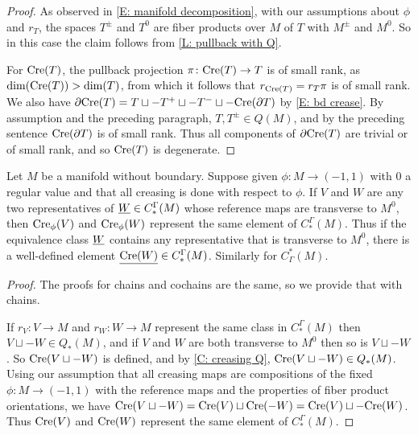\begin{proof}
	As observed in \cref{E: manifold decomposition}, with our assumptions about $\phi$ and $r_T$, the spaces $T^\pm$ and $T^0$ are fiber products over $M$ of $T$ with $M^\pm$ and $M^0$.
	So in this case the claim follows from \cref{L: pullback with Q}.

	For $\mathrm{Cre}(T)$, the pullback projection $\pi \colon \mathrm{Cre}(T) \to T$ is of small rank, as $\dim(\mathrm{Cre}(T))>\dim(T)$, from which it follows that $r_{\mathrm{Cre}(T)} = r_T\pi$ is of small rank.
	We also have $\partial \mathrm{Cre}(T) = T \sqcup - T^+ \sqcup -T^- \sqcup -\mathrm{Cre}(\partial T)$ by \cref{E: bd crease}.
	By assumption and the preceding paragraph, $T, T^\pm \in Q(M)$, and by the preceding sentence $\mathrm{Cre}(\partial T)$ is of small rank.
	Thus all components of $\partial \mathrm{Cre}(T)$ are trivial or of small rank, and so $\mathrm{Cre}(T)$ is degenerate.
\end{proof}

\begin{proposition}
	Let $M$ be a manifold without boundary.
	Suppose given $\phi \colon M \to (-1,1)$ with $0$ a regular value and that all creasing is done with respect to $\phi$.
	If $V$ and $W$ are any two representatives of $\underline{W} \in C_*^\Gamma(M)$ whose reference maps are transverse to $M^0$, then $\mathrm{Cre}_\phi(V)$ and $\mathrm{Cre}_\phi(W)$ represent the same element of $C_*^\Gamma(M)$.
	Thus if the equivalence class $\underline{W}$ contains any representative that is transverse to $M^0$, there is a well-defined element $\underline{\mathrm{Cre}(W)} \in C_*^\Gamma(M)$.
	Similarly for $C^*_\Gamma(M)$.
\end{proposition}

\begin{proof}
	The proofs for chains and cochains are the same, so we provide that with chains.

	If $r_V \colon V \to M$ and $r_W \colon W \to M$ represent the same class in $C_*^\Gamma(M)$ then $V \sqcup -W \in Q_*(M)$, and if $V$ and $W$ are both transverse to $M^0$ then so is $V \sqcup -W$.
	So $\mathrm{Cre}(V\sqcup-W)$ is defined, and by \cref{C: creasing Q}, $\mathrm{Cre}(V \sqcup -W) \in Q_*(M)$.
	Using our assumption that all creasing maps are compositions of the fixed $\phi \colon M \to (-1,1)$ with the reference maps and the properties of fiber product orientations, we have $\mathrm{Cre}(V \sqcup -W) = \mathrm{Cre}(V) \sqcup \mathrm{Cre}(-W) = \mathrm{Cre}(V) \sqcup -\mathrm{Cre}(W)$.
	Thus $\mathrm{Cre}(V)$ and $\mathrm{Cre}(W)$ represent the same element of $C_*^\Gamma(M)$.
\end{proof}

